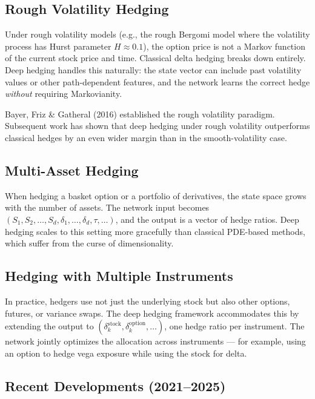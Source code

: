 \documentclass[11pt, a4paper]{article}
\theoremstyle{definition}
\theoremstyle{plain}
\theoremstyle{remark}
\begin{document}
\subsection{Rough Volatility Hedging}

Under rough volatility models (e.g., the rough Bergomi model where the volatility process
has Hurst parameter $H \approx 0.1$), the option price is not a Markov function
of the current stock price and time.
Classical delta hedging breaks down entirely.
Deep hedging handles this naturally: the state vector can include past volatility values
or other path-dependent features, and the network learns the correct hedge
\emph{without} requiring Markovianity.

Bayer, Friz \& Gatheral (2016) established the rough volatility paradigm.
Subsequent work has shown that deep hedging under rough volatility outperforms
classical hedges by an even wider margin than in the smooth-volatility case.

\subsection{Multi-Asset Hedging}

When hedging a basket option or a portfolio of derivatives,
the state space grows with the number of assets.
The network input becomes $(S_1, S_2, \ldots, S_d, \delta_1, \ldots, \delta_d, \tau, \ldots)$,
and the output is a vector of hedge ratios.
Deep hedging scales to this setting more gracefully than classical PDE-based methods,
which suffer from the curse of dimensionality.

\subsection{Hedging with Multiple Instruments}

In practice, hedgers use not just the underlying stock but also other options,
futures, or variance swaps.
The deep hedging framework accommodates this by extending the output to
$(\delta_k^{\text{stock}}, \delta_k^{\text{option}}, \ldots)$,
one hedge ratio per instrument.
The network jointly optimizes the allocation across instruments ---
for example, using an option to hedge vega exposure while using the stock for delta.

\subsection{Recent Developments (2021--2025)}
\end{document}
